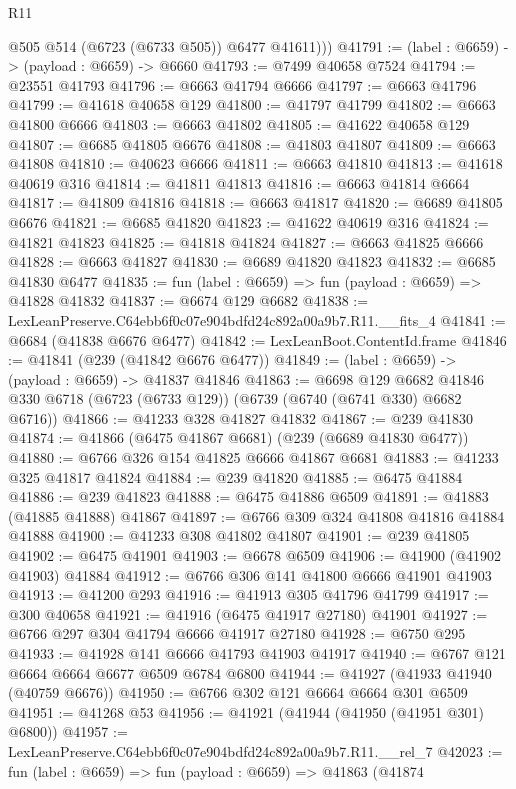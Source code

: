 \begin{lexlean}{R11}
\begin{coremodule}
          @505
          @514
          (@6723 (@6733 @505))
          @6477
          @41611)))
@41791 := (label : @6659) -> (payload : @6659) -> @6660
@41793 := @7499 @40658 @7524
@41794 := @23551 @41793
@41796 := @6663 @41794 @6666
@41797 := @6663 @41796
@41799 := @41618 @40658 @129
@41800 := @41797 @41799
@41802 := @6663 @41800 @6666
@41803 := @6663 @41802
@41805 := @41622 @40658 @129
@41807 := @6685 @41805 @6676
@41808 := @41803 @41807
@41809 := @6663 @41808
@41810 := @40623 @6666
@41811 := @6663 @41810
@41813 := @41618 @40619 @316
@41814 := @41811 @41813
@41816 := @6663 @41814 @6664
@41817 := @41809 @41816
@41818 := @6663 @41817
@41820 := @6689 @41805 @6676
@41821 := @6685 @41820
@41823 := @41622 @40619 @316
@41824 := @41821 @41823
@41825 := @41818 @41824
@41827 := @6663 @41825 @6666
@41828 := @6663 @41827
@41830 := @6689 @41820 @41823
@41832 := @6685 @41830 @6477
@41835 := fun (label : @6659) => fun (payload : @6659) => @41828 @41832
@41837 := @6674 @129 @6682
@41838 := LexLeanPreserve.C64ebb6f0c07e904bdfd24c892a00a9b7.R11.__fits_4
@41841 := @6684 (@41838 @6676 @6477)
@41842 := LexLeanBoot.ContentId.frame
@41846 := @41841 (@239 (@41842 @6676 @6477))
@41849 := (label : @6659) -> (payload : @6659) -> @41837 @41846
@41863 := @6698
    @129
    @6682
    @41846
    @330
    @6718
    (@6723 (@6733 @129))
    (@6739 (@6740 (@6741 @330) @6682 @6716))
@41866 := @41233 @328 @41827 @41832
@41867 := @239 @41830
@41874 := @41866 (@6475 @41867 @6681) (@239 (@6689 @41830 @6477))
@41880 := @6766 @326 @154 @41825 @6666 @41867 @6681
@41883 := @41233 @325 @41817 @41824
@41884 := @239 @41820
@41885 := @6475 @41884
@41886 := @239 @41823
@41888 := @6475 @41886 @6509
@41891 := @41883 (@41885 @41888) @41867
@41897 := @6766 @309 @324 @41808 @41816 @41884 @41888
@41900 := @41233 @308 @41802 @41807
@41901 := @239 @41805
@41902 := @6475 @41901
@41903 := @6678 @6509
@41906 := @41900 (@41902 @41903) @41884
@41912 := @6766 @306 @141 @41800 @6666 @41901 @41903
@41913 := @41200 @293
@41916 := @41913 @305 @41796 @41799
@41917 := @300 @40658
@41921 := @41916 (@6475 @41917 @27180) @41901
@41927 := @6766 @297 @304 @41794 @6666 @41917 @27180
@41928 := @6750 @295
@41933 := @41928 @141 @6666 @41793 @41903 @41917
@41940 := @6767 @121 @6664 @6664 @6677 @6509 @6784 @6800
@41944 := @41927 (@41933 @41940 (@40759 @6676))
@41950 := @6766 @302 @121 @6664 @6664 @301 @6509
@41951 := @41268 @53
@41956 := @41921 (@41944 (@41950 (@41951 @301) @6800))
@41957 := LexLeanPreserve.C64ebb6f0c07e904bdfd24c892a00a9b7.R11.__rel_7
@42023 := fun (label : @6659) =>
  fun (payload : @6659) =>
  @41863
    (@41874

\end{coremodule}
\end{lexlean}
